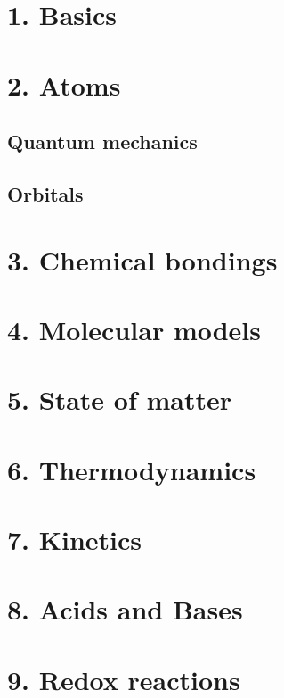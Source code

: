 \documentclass{cheatsheet}
\author{Noa Sendlhofer \& Christian Leser \\ nsendlhofer \& cleser}
\begin{document}
\section{1. Basics} %
	

\section{2. Atoms} %
	\subsection{Quantum mechanics}
	
	\subsection{Orbitals}
	

\section{3. Chemical bondings} %
	

\section{4. Molecular models}
	

\section{5. State of matter} %
	

\section{6. Thermodynamics}
	

\section{7. Kinetics}
	

\section{8. Acids and Bases}
	

\section{9. Redox reactions}
	
\end{document}

